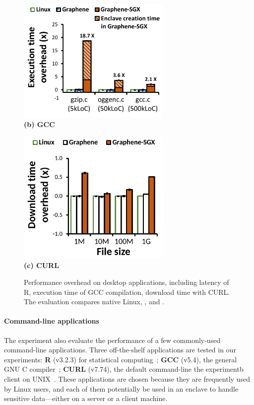 \begin{figure}[t!]
\centering
\footnotesize
\begin{minipage}{.49\textwidth}
\centering
\includegraphics[width=20em]{sgx/gcc-overhead}\\
\vspace{3pt}
{\bf (b) GCC}
\end{minipage}
\begin{minipage}{.49\textwidth}
\centering
\includegraphics[width=20em]{sgx/curl-overhead}\\
\vspace{3pt}
{\bf (c) CURL}
\end{minipage}
\caption{Performance overhead on desktop applications, including latency of R, execution time of GCC compilation, download time with CURL. The evaluation compares native Linux, \graphene{}, and \graphenesgx{}.} %
\label{fig:desktop-overhead}
\end{figure}



\paragraph{Command-line applications}


The experiment also evaluate the performance of a few commonly-used command-line applications.
Three off-the-shelf applications are tested in our experiments:
{\bf R} (v3.2.3) for statistical computing~\cite{r-project}; {\bf GCC} (v5.4), the general GNU C compiler~\cite{gcc}; {\bf CURL} (v7.74), the default command-line the experimentb client on UNIX~\cite{curl}.
These applications are chosen because they are frequently used by Linux users,
and each of them potentially  be used 
in an enclave to handle sensitive data---either on a server or a client
machine.



